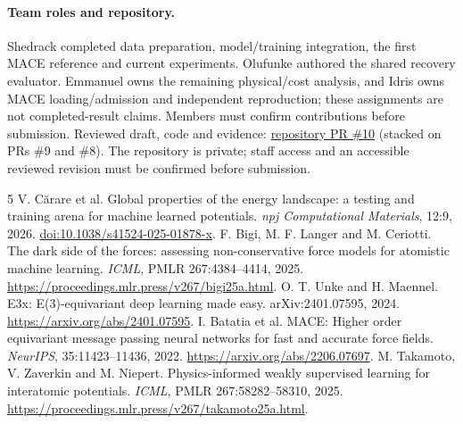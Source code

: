 \documentclass{article}
\begin{document}
\paragraph{Team roles and repository.}
Shedrack completed data preparation, model/training integration, the first MACE reference and current experiments. Olufunke authored the shared recovery evaluator. Emmanuel owns the remaining physical/cost analysis, and Idris owns MACE loading/admission and independent reproduction; these assignments are not completed-result claims. Members must confirm contributions before submission. Reviewed draft, code and evidence: \href{https://github.com/Shedrackeze002/idl-molecular-force-consistency/pull/10}{repository PR \#10} (stacked on PRs \#9 and \#8). The repository is private; staff access and an accessible reviewed revision must be confirmed before submission.
\begin{thebibliography}{5}\small
{} V. C\u{a}rare et al. Global properties of the energy landscape: a testing and training arena for machine learned potentials. \emph{npj Computational Materials}, 12:9, 2026. \href{https://doi.org/10.1038/s41524-025-01878-x}{doi:10.1038/s41524-025-01878-x}.
 F. Bigi, M. F. Langer and M. Ceriotti. The dark side of the forces: assessing non-conservative force models for atomistic machine learning. \emph{ICML}, PMLR 267:4384--4414, 2025. \url{https://proceedings.mlr.press/v267/bigi25a.html}.
 O. T. Unke and H. Maennel. E3x: E(3)-equivariant deep learning made easy. arXiv:2401.07595, 2024. \url{https://arxiv.org/abs/2401.07595}.
 I. Batatia et al. MACE: Higher order equivariant message passing neural networks for fast and accurate force fields. \emph{NeurIPS}, 35:11423--11436, 2022. \url{https://arxiv.org/abs/2206.07697}.
 M. Takamoto, V. Zaverkin and M. Niepert. Physics-informed weakly supervised learning for interatomic potentials. \emph{ICML}, PMLR 267:58282--58310, 2025. \url{https://proceedings.mlr.press/v267/takamoto25a.html}.
\end{thebibliography}
\end{document}
